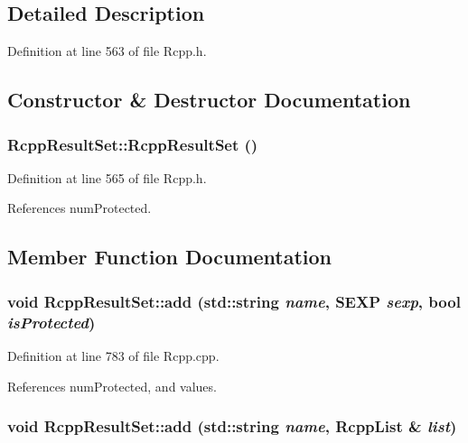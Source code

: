 \subsection{Detailed Description}


Definition at line 563 of file Rcpp.h.

\subsection{Constructor \& Destructor Documentation}
\hypertarget{classRcppResultSet_ab799c6b9bd730e55d92228203903ba74}{
\subsubsection[{RcppResultSet}]{\setlength{\rightskip}{0pt plus 5cm}RcppResultSet::RcppResultSet ()}}
\label{classRcppResultSet_ab799c6b9bd730e55d92228203903ba74}


Definition at line 565 of file Rcpp.h.

References numProtected.

\subsection{Member Function Documentation}
\hypertarget{classRcppResultSet_a5f44a63a2cab43db551c0e27d6fec378}{
\subsubsection[{add}]{\setlength{\rightskip}{0pt plus 5cm}void RcppResultSet::add (std::string {\em name}, \/  SEXP {\em sexp}, \/  bool {\em isProtected})}}
\label{classRcppResultSet_a5f44a63a2cab43db551c0e27d6fec378}


Definition at line 783 of file Rcpp.cpp.

References numProtected, and values.\hypertarget{classRcppResultSet_a37b3d22adf1e47eec75ee664085daa59}{
\subsubsection[{add}]{\setlength{\rightskip}{0pt plus 5cm}void RcppResultSet::add (std::string {\em name}, \/  {\bf RcppList} \& {\em list})}}
\label{classRcppResultSet_a37b3d22adf1e47eec75ee664085daa59}


